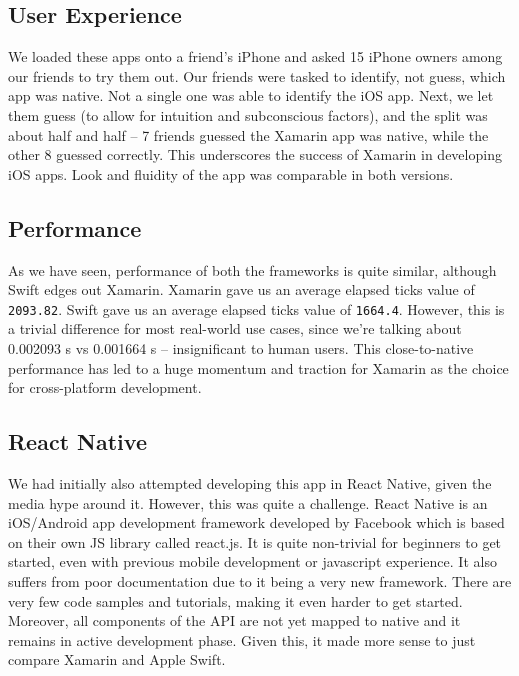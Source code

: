 \documentclass[12pt,a4paper]{article}
\begin{document}
	\subsection{User Experience}
	
	We loaded these apps onto a friend's iPhone and asked 15 iPhone owners among our friends to try them out. Our friends were tasked to identify, not guess, which app was native. Not a single one was able to identify the iOS app. Next, we let them guess (to allow for intuition and subconscious factors), and the split was about half and half -- 7 friends guessed the Xamarin app was native, while the other 8 guessed correctly. This underscores the success of Xamarin in developing iOS apps. Look and fluidity of the app was comparable in both versions.
	
	\subsection{Performance}
	
	As we have seen, performance of both the frameworks is quite similar, although Swift edges out Xamarin. Xamarin gave us an average elapsed ticks value of \texttt{2093.82}. Swift gave us an average elapsed ticks value of \texttt{1664.4}. However, this is a trivial difference for most real-world use cases, since we're talking about 0.002093 s vs 0.001664 s -- insignificant to human users. This close-to-native performance has led to a huge momentum and traction for Xamarin as the choice for cross-platform development.
	
	\subsection{React Native}
	
	We had initially also attempted developing this app in React Native, given the media hype around it. However, this was quite a challenge. React Native is an iOS/Android app development framework developed by Facebook which is based on their own JS library called react.js. It is quite non-trivial for beginners to get started, even with previous mobile development or javascript experience. It also suffers from poor documentation due to it being a very new framework. There are very few code samples and tutorials, making it even harder to get started. Moreover, all components of the API are not yet mapped to native and it remains in active development phase. Given this, it made more sense to just compare Xamarin and Apple Swift.
	
\end{document}
